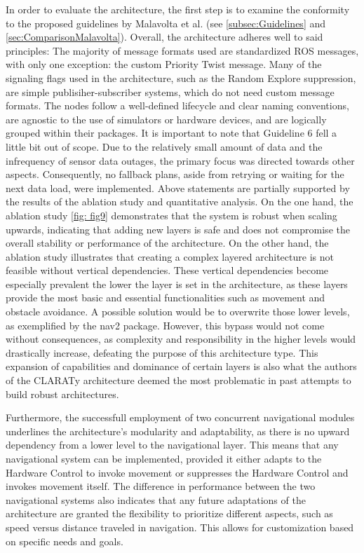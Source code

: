 \documentclass[%
paper=A4,               %
twoside=true,           %
openright,              %
11pt,                   %
bibliography=totoc,     %
titlepage=on,           %
DIV=12,                 %
BCOR=1.5cm,             %
parskip=half,            %
final
]{scrreprt}
\begin{document}
	In order to evaluate the architecture, the first step is to examine the conformity to the proposed guidelines by Malavolta et al. (see \ref{subsec:Guidelines} and \ref{sec:ComparisonMalavolta}). 
	Overall, the architecture adheres well to said principles: The majority of message formats used are standardized ROS messages, with only one exception: the custom Priority Twist message. Many of the signaling flags used in the architecture, such as the Random Explore suppression, are simple publisiher-subscriber systems, which do not need custom message formats. The nodes follow a well-defined lifecycle and clear naming conventions, are agnostic to the use of simulators or hardware devices, and are logically grouped within their packages. It is important to note that Guideline 6 fell a little bit out of scope. Due to the relatively small amount of data and the infrequency of sensor data outages, the primary focus was directed towards other aspects. Consequently, no fallback plans, aside from retrying or waiting for the next data load, were implemented.
	Above statements are partially supported by the results of the ablation study and quantitative analysis. On the one hand, the ablation study \ref{fig: fig9} demonstrates that the system is robust when scaling upwards, indicating that adding new layers is safe and does not compromise the overall stability or performance of the architecture. On the other hand, the ablation study illustrates that creating a complex layered architecture is not feasible without vertical dependencies. These vertical dependencies become especially prevalent the lower the layer is set in the architecture, as these layers provide the most basic and essential functionalities such as movement and obstacle avoidance. A possible solution would be to overwrite those lower levels, as exemplified by the nav2 package. However, this bypass would not come without consequences, as complexity and responsibility in the higher levels would drastically increase, defeating the purpose of this architecture type. This expansion of capabilities and dominance of certain layers is also what the authors of the CLARATy architecture deemed the most problematic in past attempts to build robust architectures.  \newline
	
	Furthermore, the successfull employment of two concurrent navigational modules underlines the architecture's modularity and adaptability, as there is no upward dependency from a lower level to the navigational layer. This means that any navigational system can be implemented, provided it either adapts to the Hardware Control to invoke movement or suppresses the Hardware Control and invokes movement itself. The difference in performance between the two navigational systems also indicates that any future adaptations of the architecture are granted the flexibility to prioritize different aspects, such as speed versus distance traveled in navigation. This allows for customization based on specific needs and goals. \newline 
		
\end{document}
